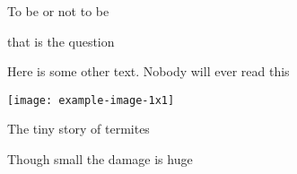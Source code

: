 \documentclass{article}
\begin{document}
\pagestyle{empty}
\setlength{\parskip}{0pt}
\parbox[c]{.25\textwidth}{%
To be or not to be\par that is the question 
}
\hfill
\parbox[c]{.25\textwidth}{%
Here is some other text. Nobody will ever read this 
}
\hfill
\parbox[c]{.15\textwidth}{%
\texttt{[image: example-image-1x1]}
}

\vspace{.2\textheight}
\begin{tcolorbox}
	\tiny\centering  The tiny story of termites
\end{tcolorbox}
\centering Though small the damage is huge
\end{document}
